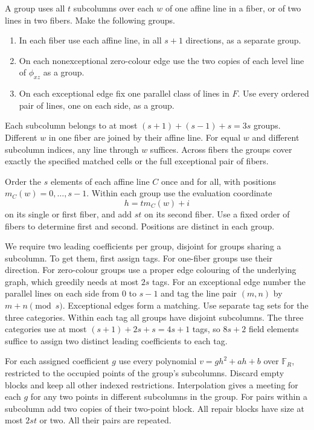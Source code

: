 \documentclass[10pt]{article}
\newcommand{\F}{\mathbb F}
\begin{document}
A group uses all $t$ subcolumns over each $w$ of one affine line in a fiber, or of two lines in two fibers. Make the following groups.
\begin{enumerate}
\item In each fiber use each affine line, in all $s+1$ directions, as a separate group.
\item On each nonexceptional zero-colour edge use the two copies of each level line of $\phi_{xz}$ as a group.
\item On each exceptional edge fix one parallel class of lines in $F$. Use every ordered pair of lines, one on each side, as a group.
\end{enumerate}
Each subcolumn belongs to at most $(s+1)+(s-1)+s=3s$ groups. Different $w$ in one fiber are joined by their affine line. For equal $w$ and different subcolumn indices, any line through $w$ suffices. Across fibers the groups cover exactly the specified matched cells or the full exceptional pair of fibers.

Order the $s$ elements of each affine line $C$ once and for all, with positions $m_C(w)=0,\ldots,s-1$. Within each group use the evaluation coordinate
\[
 h=t m_C(w)+i
\]
on its single or first fiber, and add $st$ on its second fiber. Use a fixed order of fibers to determine first and second. Positions are distinct in each group.

We require two leading coefficients per group, disjoint for groups sharing a subcolumn. To get them, first assign tags. For one-fiber groups use their direction. For zero-colour groups use a proper edge colouring of the underlying graph, which greedily needs at most $2s$ tags. For an exceptional edge number the parallel lines on each side from $0$ to $s-1$ and tag the line pair $(m,n)$ by $m+n\pmod s$. Exceptional edges form a matching. Use separate tag sets for the three categories. Within each tag all groups have disjoint subcolumns. The three categories use at most $(s+1)+2s+s=4s+1$ tags, so $8s+2$ field elements suffice to assign two distinct leading coefficients to each tag.

For each assigned coefficient $g$ use every polynomial $v=gh^2+ah+b$ over $\F_R$, restricted to the occupied points of the group's subcolumns. Discard empty blocks and keep all other indexed restrictions. Interpolation gives a meeting for each $g$ for any two points in different subcolumns in the group. For pairs within a subcolumn add two copies of their two-point block. All repair blocks have size at most $2st$ or two. All their pairs are repeated.
\end{document}
